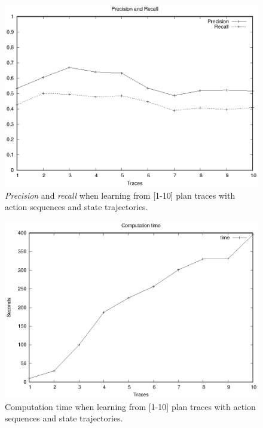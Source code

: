 \begin{figure}[hbt!]
	\centering
	\includegraphics[width=0.65\linewidth]{figures/input_size_0_0_precision.eps}
	\caption{{\em Precision} and {\em recall} when learning from [1-10] plan traces with \NO action sequences and \NO state trajectories.}
	\label{fig:pspace_quality}
\end{figure}
\begin{figure}[hbt!]
	\centering
	\includegraphics[width=0.65\linewidth]{figures/input_size_0_0_time.eps}
	\caption{Computation time when learning from [1-10] plan traces with \NO action sequences and \NO state trajectories.}
	\label{fig:pspace_time}
\end{figure}



